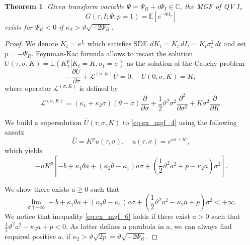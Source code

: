 \documentclass[11pt,a4paper] {article}
\newtheorem{theorem}{Theorem}[section]
\begin{document}
\begin{theorem}\label{thm::existence_MGF_I}
Given transform variable $\Psi=\Psi_R+i\Psi_I\in \mathbb{C}$, the MGF of QV $I_\tau$
\begin{equation*}
G(\tau,I;\Psi;p=1)=\mathbb{E}[e^{-\Psi I_\tau}]
\end{equation*}
exists for $\Psi_R<0$ if $\kappa_2>\vartheta\sqrt{-2\Psi_R}$.
\end{theorem}
\begin{proof}
We denote $K_t=e^{I_t}$ which satisfies SDE $dK_t=K_t\, dI_t = K_t\sigma_t^2\, dt$
and set $p=-\Psi_R$. Feynman-Kac formula allows to recast the solution 
$
U(\tau, \sigma, K)=\mathbb{E}\left(\left. K_T^{p}\right| K_t=K, \sigma_t=\sigma\right)
$
as the solution of the Cauchy problem
\begin{equation}\label{eq:ex_mgf_4}
-\frac{\partial U}{\partial\tau}+\mathcal{L}^{(\sigma, K)}U=0,\quad U(0,\sigma,K)=K,
\end{equation}
where operator $\mathcal{L}^{(\sigma, K)}$ is defined by
\begin{equation*}
\mathcal{L}^{(\sigma, K)}=(\kappa_1+\kappa_2\sigma)(\theta-\sigma)\frac{\partial}{\partial\sigma}+
\frac{1}{2}\vartheta^2\sigma^2\frac{\partial^2}{\partial\sigma^2}+K\sigma^2\frac{\partial}{\partial K}.
\end{equation*}

We build a supersolution $\bar{U}(\tau, \sigma, K)$ to \eqref{eq:ex_mgf_4} using the following ansatz 
\begin{equation}\label{eq:ex_mgf_5}
\bar{U}=K^{p}u(\tau,\sigma),\quad u(\tau,\sigma)=e^{a\sigma+b\tau},
\end{equation}
which yields
\begin{equation*}
-uK^{p}\left[-b+\kappa_1\theta a+(\kappa_2\theta-\kappa_1)a\sigma + \left(\frac{1}{2}\vartheta^2a^2+p-\kappa_2a\right)\sigma^2\right].
\end{equation*}

We show there exists $a\ge 0$ such that
\begin{equation}\label{eq:ex_mgf_6}
\lim_{\sigma\uparrow+\infty}-b+\kappa_1\theta a+(\kappa_2\theta-\kappa_1)a\sigma + \left(\frac{1}{2}\vartheta^2a^2-\kappa_2a+p\right)\sigma^2<+\infty.
\end{equation}
We notice that inequality \eqref{eq:ex_mgf_6} holds if there exist $a>0$ such that
$
\frac{1}{2}\vartheta^2a^2-\kappa_2a+p<0
$. 
As latter defines a parabola in $a$, we can always find required positive $a$, if 
$
\kappa_2>\vartheta\sqrt{2p}=\vartheta\sqrt{-2\Psi_R}.
$
\end{proof}
\end{document}
